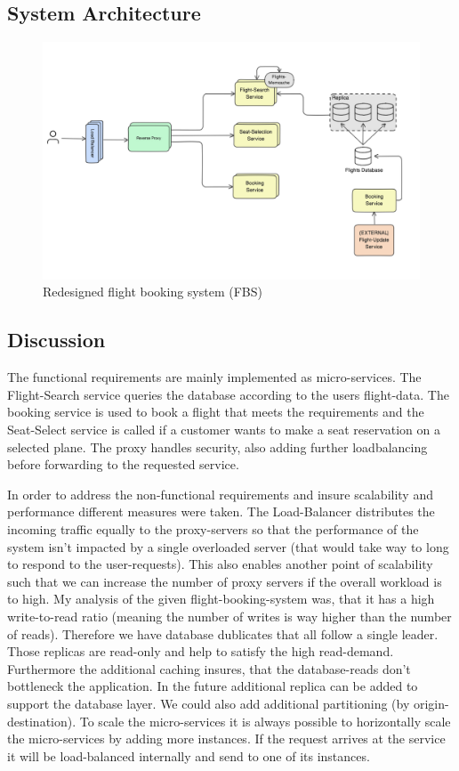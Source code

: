 \documentclass{article}
\begin{document}
\subsection{System Architecture}
\begin{figure}
    \centering
    \includegraphics[width=\linewidth]{images/1st_system_design_sketch.png}
    \caption{Redesigned flight booking system (FBS)}
    \label{fig:fbs_design}
\end{figure}
\newpage 

\subsection{Discussion}
The functional requirements are mainly implemented as micro-services.
The Flight-Search service queries the database according to the users flight-data. The booking service is used to book a flight that meets the requirements and the Seat-Select service is called if a customer wants to make a seat reservation on a selected plane. 
The proxy handles security, also adding further loadbalancing before forwarding to the requested service. 

In order to address the non-functional requirements and insure scalability and performance different measures were taken. 
The Load-Balancer distributes the incoming traffic equally to the proxy-servers so that the performance of the system isn't impacted by a single overloaded server (that would take way to long to respond to the user-requests). This also enables another point of scalability such that we can increase the number of proxy servers if the overall workload is to high.
My analysis of the given flight-booking-system was, that it has a high write-to-read ratio (meaning the number of writes is way higher than the number of reads). Therefore we have database dublicates that all follow a single leader. 
Those replicas are read-only and help to satisfy the high read-demand. Furthermore the additional caching insures, that the database-reads don't bottleneck the application. In the future additional replica can be added to support the database layer. We could also add additional partitioning (by origin-destination). 
To scale the micro-services it is always possible to horizontally scale the micro-services by adding more instances. If the request arrives at the service it will be load-balanced internally and send to one of its instances.
\end{document}

